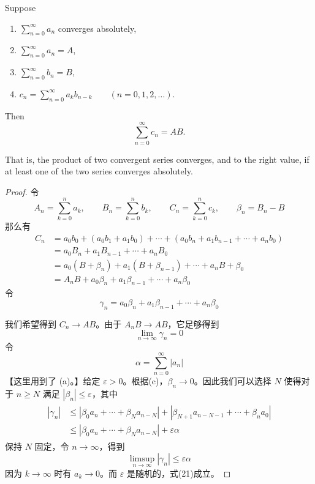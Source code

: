 \documentclass[../poma-notes.tex]{subfiles}
\begin{document}
\newpage
\begin{theorem}
  Suppose
  \begin{enumerate}[label=(\alph*)]
    \item $\sum_{n=0}^{\infty} a_n$ converges absolutely,
    \item $\sum_{n=0}^{\infty} a_n = A$,
    \item $\sum_{n=0}^{\infty} b_n = B$,
    \item $c_n = \sum_{n=0}^{\infty} a_k b_{n-k} \qquad (n=0,1,2,\dots)$.
  \end{enumerate}
  Then
  \[
    \sum_{n=0}^{\infty} c_n = AB.
  \]

  That is, the product of two convergent series converges, and to the right value, if at least one of the two series converges absolutely.
\end{theorem}

\begin{proof}
  令
  \[
    A_n = \sum_{k=0}^{n} a_k,\qquad B_n = \sum_{k=0}^{n} b_k,\qquad C_n = \sum_{k=0}^{n} c_k,\qquad \beta_n = B_n - B
  \]
  那么有
  \begin{equation*}
    \begin{split}
      C_n & = a_0 b_0 + (a_0 b_1 + a_1 b_0) + \cdots + (a_0 b_n + a_1 b_{n-1} + \cdots + a_n b_0) \\
      & = a_0 B_n + a_1 B_{n-1} + \cdots + a_n B_0 \\
      & = a_0 (B + \beta_n) + a_1 (B + \beta_{n-1}) + \cdots + a_n {B + \beta_0} \\
      & = A_n B + a_0 \beta_n + a_1 \beta_{n-1} + \cdots + a_n \beta_0
    \end{split}
  \end{equation*}
  令
  \[
    \gamma_n = a_0 \beta_n + a_1 \beta_{n-1} + \cdots + a_n \beta_0
  \]

  我们希望得到 $C_n \to AB$。由于 $A_n B \to AB$，它足够得到
  \begin{equation}
    \lim_{n\to\infty} \gamma_n = 0
  \end{equation}
  令
  \[
    \alpha = \sum_{n=0}^{\infty} |a_n|
  \]
  【这里用到了 (a)。】给定 $\varepsilon > 0$。根据(c)，$\beta_n \to 0$。因此我们可以选择 $N$ 使得对于 $n \ge N$ 满足
  $|\beta_n| \le \varepsilon$，其中
  \begin{align*}
    \begin{split}
      |\gamma_n| & \le |\beta_0 a_n + \cdots + \beta_N a_{n-N}| + |\beta_{N+1} a_{n-N-1} + \cdots + \beta_n a_0| \\
      & \le |\beta_0 a_n + \cdots + \beta_N a_{n-N}| + \varepsilon\alpha
    \end{split}
  \end{align*}
  保持 $N$ 固定，令 $n \to \infty$，得到
  \[
    \limsup_{n\to\infty} |\gamma_n| \le \varepsilon\alpha
  \]
  因为 $k \to \infty$ 时有 $a_k \to 0$。而 $\varepsilon$ 是随机的，式(21)成立。
\end{proof}
\end{document}
